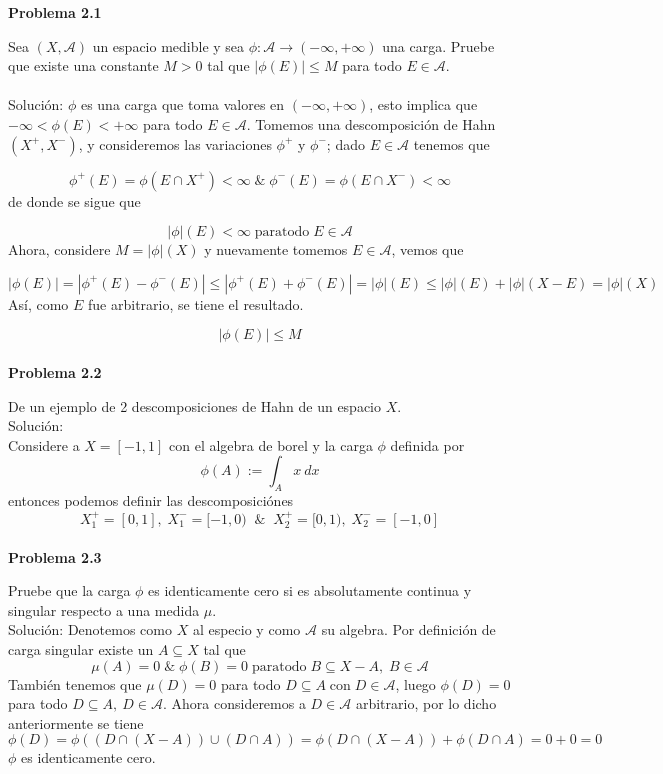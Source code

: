 \documentclass[12pt]{article}
\begin{document}
    \textbf{Problema 2.1}  

    Sea $(X,\mathscr{A})$ un espacio medible y sea $\phi : \mathscr{A}\longrightarrow (-\infty,+\infty)$ 
    una carga. Pruebe que existe una constante $M>0$ tal que $|\phi (E)|\leq M$ para todo $E\in \mathscr{A}$. \\ \\
    
    Soluci\'on:
    $\phi$ es una carga que toma valores en $(-\infty,+\infty)$, esto implica que $-\infty < \phi (E) < +\infty$
    para todo $E\in \mathscr{A}$. Tomemos una descomposici\'on de Hahn $(X^+,X^-)$, y
    consideremos las variaciones $\phi^+$ y $\phi^-$; dado $E\in \mathscr{A}$ tenemos que 

    \[\phi^+(E)=\phi(E\cap X^+) <\infty \; \& \; \phi^-(E)=\phi(E\cap X^-) <\infty\]
    de donde se sigue que 
     
    \[|\phi|(E)<\infty \; \mathrm{para todo} \; E\in \mathscr{A}\]
    Ahora, considere $M=|\phi|(X)$ y nuevamente tomemos $E\in \mathscr{A}$, vemos que 

    \[|\phi (E)|=|\phi^+(E)-\phi^-(E)| \leq |\phi^+(E)+\phi^-(E)|=|\phi|(E) \leq |\phi|(E)+|\phi|(X-E)=|\phi|(X)\]
    As\'i, como $E$ fue arbitrario, se tiene el resultado.

    \[|\phi (E)| \leq M\]
    \\

    \textbf{Problema 2.2}

    De un ejemplo de 2 descomposiciones de Hahn de un espacio $X$. \\ 
    
    Soluci\'on: \\
    Considere a $X=[-1,1]$ con el algebra de borel y la carga $\phi$ definida por 
    \[\phi (A):=\int_Ax\:dx\] 
    entonces podemos definir las descomposici\'ones 
    \[X_1^+=[0,1],\;X_1^-=[-1,0) \;\; \& \;\; X_2^+=[0,1),\;X_2^-=[-1,0]\] 
    \\

    \textbf{Problema 2.3}

    Pruebe que la carga $\phi$ es identicamente cero si es absolutamente continua y singular
    respecto a una medida $\mu$. \\ 

    Soluci\'on:
    Denotemos como $X$ al especio y como $\mathscr{A}$ su algebra. Por definici\'on de carga singular existe un $A\subseteq X$ tal que
    \[\mu (A)=0 \; \& \; \phi (B)=0 \; \mathrm{para todo} \; B\subseteq X-A, \; B\in \mathscr{A}\]
    Tambi\'en tenemos que $\mu (D)=0$ para todo $D\subseteq A \; \mathrm{con }\; D\in \mathscr{A}$, luego $\phi (D)=0$ para todo $D\subseteq A,\: D\in \mathscr{A}$. 
    Ahora consideremos a $D\in \mathscr{A}$ arbitrario, por lo dicho anteriormente se tiene
    \[\phi (D)=\phi ((D\cap (X-A)) \cup (D\cap A))=\phi (D\cap (X-A))+\phi (D\cap A)=0+0=0\]
    $\phi$ es identicamente cero. \\ \\
\end{document}
